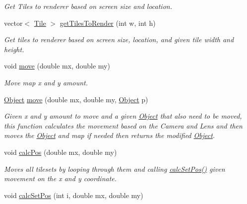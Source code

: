 \begin{DoxyCompactItemize}
\begin{DoxyCompactList}\small\item\em Get Tiles to renderer based on screen size and location. \end{DoxyCompactList}\item 
vector$<$ \hyperlink{classTile}{Tile} $>$ \hyperlink{classTileset_a2f21ec594886baf1bbb990a57dca8bfc}{get\+Tiles\+To\+Render} (int w, int h)\hypertarget{classTileset_a2f21ec594886baf1bbb990a57dca8bfc}{}\label{classTileset_a2f21ec594886baf1bbb990a57dca8bfc}

\begin{DoxyCompactList}\small\item\em Get tiles to renderer based on screen size, location, and given tile width and height. \end{DoxyCompactList}\item 
void \hyperlink{classTileset_a592ad17ba76112a7ee46df52f9a44e3a}{move} (double mx, double my)\hypertarget{classTileset_a592ad17ba76112a7ee46df52f9a44e3a}{}\label{classTileset_a592ad17ba76112a7ee46df52f9a44e3a}

\begin{DoxyCompactList}\small\item\em Move map x and y amount. \end{DoxyCompactList}\item 
\hyperlink{classObject}{Object} \hyperlink{classTileset_a1e3351adc4d2828b2d276955c0c7cbfe}{move} (double mx, double my, \hyperlink{classObject}{Object} p)\hypertarget{classTileset_a1e3351adc4d2828b2d276955c0c7cbfe}{}\label{classTileset_a1e3351adc4d2828b2d276955c0c7cbfe}

\begin{DoxyCompactList}\small\item\em Given x and y amount to move and a given \hyperlink{classObject}{Object} that also need to be moved, this function calculates the movement based on the Camera and Lens and then moves the \hyperlink{classObject}{Object} and map if needed then returns the modified \hyperlink{classObject}{Object}. \end{DoxyCompactList}\item 
void \hyperlink{classTileset_a5910c3fdfcabddbc45c81d8337acbef6}{calc\+Pos} (double mx, double my)\hypertarget{classTileset_a5910c3fdfcabddbc45c81d8337acbef6}{}\label{classTileset_a5910c3fdfcabddbc45c81d8337acbef6}

\begin{DoxyCompactList}\small\item\em Moves all tilesets by looping through them and calling \hyperlink{classTileset_afbcba6ec8087f3b14d96a538159cc3a3}{calc\+Set\+Pos()} given movement on the x and y coordinate. \end{DoxyCompactList}\item 
void \hyperlink{classTileset_afbcba6ec8087f3b14d96a538159cc3a3}{calc\+Set\+Pos} (int i, double mx, double my)\hypertarget{classTileset_afbcba6ec8087f3b14d96a538159cc3a3}{}\label{classTileset_afbcba6ec8087f3b14d96a538159cc3a3}


\end{DoxyCompactItemize}
